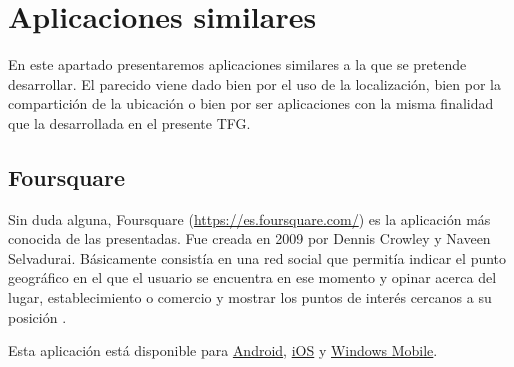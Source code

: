 \section{Aplicaciones similares}
En este apartado presentaremos aplicaciones similares a la que se pretende desarrollar. El parecido viene dado bien por el uso de la localización, bien por la compartición de la ubicación o bien por ser aplicaciones con la misma finalidad que la desarrollada en el presente \ac{TFG}.

\subsection{Foursquare}
Sin duda alguna, Foursquare (\url{https://es.foursquare.com/}) es la aplicación más conocida de las presentadas. Fue creada en 2009 por Dennis Crowley y Naveen Selvadurai. Básicamente consistía en una red social que permitía indicar el punto geográfico en el que el usuario se encuentra en ese momento \cite{Rubi13} y opinar acerca del lugar, establecimiento o comercio y mostrar los puntos de interés cercanos a su posición \cite{Cano14}. 

Esta aplicación está disponible para \href{https://play.google.com/store/apps/details?id=com.joelapenna.foursquared}{Android}, \href{https://itunes.apple.com/us/app/id306934924?mt=8}{iOS} y \href{https://www.microsoft.com/es-es/store/apps/foursquare/9wzdncrfhw3v}{Windows Mobile}.

